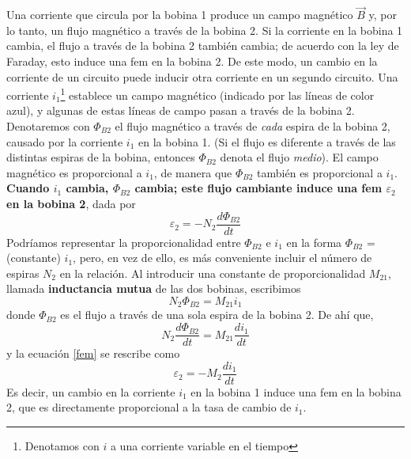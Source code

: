 Una corriente que circula por la bobina 1 produce un campo magnético $\vec{B}$ y, por lo tanto, un flujo magnético a través de la bobina 2. Si la corriente en la bobina 1 cambia, el flujo a través de la bobina 2 también cambia; de acuerdo con la ley de Faraday, esto induce una fem en la bobina 2. De este modo, un cambio en la corriente de un circuito puede inducir otra corriente en un segundo circuito.
Una corriente $i_1$\footnote{Denotamos con $i$ a una corriente variable en el tiempo } establece un campo magnético (indicado por las líneas de color azul), y algunas de estas líneas de campo pasan a través de la bobina 2. Denotaremos con $\Phi_{B2}$ el flujo magnético a través de \textit{cada} espira de la bobina 2, causado por la corriente $i_1$ en la bobina 1. (Si el flujo es diferente a través de las distintas espiras de la bobina, entonces $\Phi_{B2}$ denota el flujo  \textit{medio}). El campo magnético es proporcional a $i_1$, de manera que $\Phi_{B2}$ también es proporcional a $i_1$. \textbf{Cuando $i_1$ cambia, $\Phi_{B2}$ cambia; este flujo cambiante induce una fem $\varepsilon_2$ en la bobina 2}, dada por
\begin{equation}\label{fem}
\varepsilon_2=-N_2\frac{d\Phi_{B2}}{dt}
\end{equation}
Podríamos representar la proporcionalidad entre $\Phi_{B2}$ e $i_1$ en la forma $\Phi_{B2}$ = (constante) $i_1$, pero, en vez de ello, es más conveniente incluir el número de espiras $N_2$ en la relación. Al introducir una constante de proporcionalidad $M_{21}$, llamada \textbf{inductancia mutua} de las dos bobinas, escribimos
\begin{equation}\label{30.2}
N_2\Phi_{B2}=M_{21}i_1
\end{equation}
donde $\Phi_{B2}$ es el flujo a través de una sola espira de la bobina 2. De ahí que,
\begin{equation}
N_2\frac{d\Phi_{B2}}{dt}=M_{21}\frac{di_1}{dt}
\end{equation}
y la ecuación \ref{fem} se rescribe como
\begin{equation}
\varepsilon_2=-M_2\frac{di_1}{dt}
\end{equation}
Es decir, un cambio en la corriente $i_1$ en la bobina 1 induce una fem en la bobina 2, que es directamente proporcional a la tasa de cambio de $i_1$.

